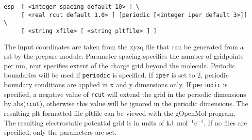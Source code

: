 \begin{verbatim}
esp  [ <integer spacing default 10> ] \
     [ <real rcut default 1.0> ] [periodic [<integer iper default 3>]] \
     [ <string xfile> [ <string pltfile> ] ]
\end{verbatim}

The input coordinates are taken from the {\rm xyzq} file that can
be generated from a {\rm rst} by the prepare module. Parameter 
spacing specifies the number of gridpoints per nm, rcut specifies 
extent of the charge grid beyond the molecule.
Periodic boundaries will be used if \verb+periodic+
is specified. If \verb+iper+ is set to 2, periodic boundary
conditions are applied in x and y dimensions only. If \verb+periodic+
is specified, a negative value of \verb+rcut+ will extend the grid
in the periodic dimensions by abs(\verb+rcut+), otherwise this value
will be ignored in the periodic dimensions.
The resulting {\rm plt} formatted file pltfile can be
viewed with the gOpenMol program. The resulting electrostatic 
potential grid is in units of kJ\ mol$^{-1}$e$^{-1}$.
If no files are specified, only the parameters are set.

